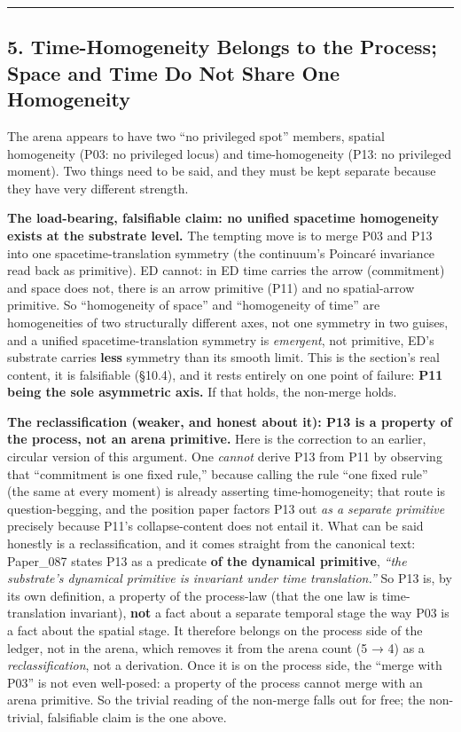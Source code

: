 \documentclass[
  11pt,
]{article}
\begin{document}
\begin{center}\rule{0.5\linewidth}{0.5pt}\end{center}

\subsection{5. Time-Homogeneity Belongs to the Process; Space and Time
Do Not Share One
Homogeneity}\label{time-homogeneity-belongs-to-the-process-space-and-time-do-not-share-one-homogeneity}

The arena appears to have two ``no privileged spot'' members, spatial
homogeneity (P03: no privileged locus) and time-homogeneity (P13: no
privileged moment). Two things need to be said, and they must be kept
separate because they have very different strength.

\textbf{The load-bearing, falsifiable claim: no unified spacetime
homogeneity exists at the substrate level.} The tempting move is to
merge P03 and P13 into one spacetime-translation symmetry (the
continuum's Poincaré invariance read back as primitive). ED cannot: in
ED time carries the arrow (commitment) and space does not, there is an
arrow primitive (P11) and no spatial-arrow primitive. So ``homogeneity
of space'' and ``homogeneity of time'' are homogeneities of two
structurally different axes, not one symmetry in two guises, and a
unified spacetime-translation symmetry is \emph{emergent}, not
primitive, ED's substrate carries \textbf{less} symmetry than its smooth
limit. This is the section's real content, it is falsifiable (§10.4),
and it rests entirely on one point of failure: \textbf{P11 being the
sole asymmetric axis.} If that holds, the non-merge holds.

\textbf{The reclassification (weaker, and honest about it): P13 is a
property of the process, not an arena primitive.} Here is the correction
to an earlier, circular version of this argument. One \emph{cannot}
derive P13 from P11 by observing that ``commitment is one fixed rule,''
because calling the rule ``one fixed rule'' (the same at every moment)
is already asserting time-homogeneity; that route is question-begging,
and the position paper factors P13 out \emph{as a separate primitive}
precisely because P11's collapse-content does not entail it. What can be
said honestly is a reclassification, and it comes straight from the
canonical text: Paper\_087 states P13 as a predicate \textbf{of the
dynamical primitive}, \emph{``the substrate's dynamical primitive is
invariant under time translation.''} So P13 is, by its own definition, a
property of the process-law (that the one law is time-translation
invariant), \textbf{not} a fact about a separate temporal stage the way
P03 is a fact about the spatial stage. It therefore belongs on the
process side of the ledger, not in the arena, which removes it from the
arena count (5 → 4) as a \emph{reclassification}, not a derivation. Once
it is on the process side, the ``merge with P03'' is not even
well-posed: a property of the process cannot merge with an arena
primitive. So the trivial reading of the non-merge falls out for free;
the non-trivial, falsifiable claim is the one above.
\end{document}
